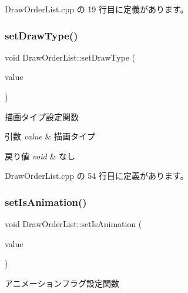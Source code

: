  Draw\+Order\+List.\+cpp の 19 行目に定義があります。

\mbox{\label{class_draw_order_list_a03d72a3943c45d19b70602ed7f526906}} 
\subsubsection{\texorpdfstring{set\+Draw\+Type()}{setDrawType()}}
{\footnotesize\ttfamily void Draw\+Order\+List\+::set\+Draw\+Type (\begin{DoxyParamCaption}\item[{\mbox{\hyperlink{class_draw_order_list_a6c9b9ceb312c16d399ef355f4f3486bb}{Draw\+Order\+List\+::\+Draw\+Type}}}]{value }\end{DoxyParamCaption})}



描画タイプ設定関数 


\begin{DoxyParams}{引数}
{\em value} & 描画タイプ \\
\hline
\end{DoxyParams}

\begin{DoxyRetVals}{戻り値}
{\em void} & なし \\
\hline
\end{DoxyRetVals}


 Draw\+Order\+List.\+cpp の 54 行目に定義があります。

\mbox{\label{class_draw_order_list_a31b85221bde032f5912219f79a93c100}} 
\subsubsection{\texorpdfstring{set\+Is\+Animation()}{setIsAnimation()}}
{\footnotesize\ttfamily void Draw\+Order\+List\+::set\+Is\+Animation (\begin{DoxyParamCaption}\item[{bool}]{value }\end{DoxyParamCaption})}



アニメーションフラグ設定関数 


